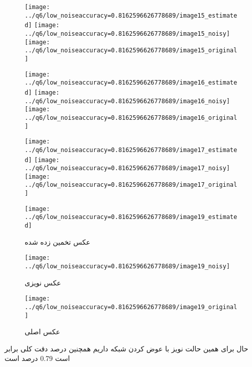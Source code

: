\documentclass[a4paper,12pt]{article}
\begin{document}
\begin{figure}[!htb]
  \texttt{[image: ../q6/low\_noiseaccuracy=0.8162596626778689/image15\_estimated]}
\endminipage\hfill
{}
  \texttt{[image: ../q6/low\_noiseaccuracy=0.8162596626778689/image15\_noisy]}
\endminipage\hfill
{}
  \texttt{[image: ../q6/low\_noiseaccuracy=0.8162596626778689/image15\_original]}
\endminipage\hfill

  \texttt{[image: ../q6/low\_noiseaccuracy=0.8162596626778689/image16\_estimated]}
\endminipage\hfill
{}
  \texttt{[image: ../q6/low\_noiseaccuracy=0.8162596626778689/image16\_noisy]}
\endminipage\hfill
{}
  \texttt{[image: ../q6/low\_noiseaccuracy=0.8162596626778689/image16\_original]}
\endminipage\hfill

  \texttt{[image: ../q6/low\_noiseaccuracy=0.8162596626778689/image17\_estimated]}
\endminipage\hfill
{}
  \texttt{[image: ../q6/low\_noiseaccuracy=0.8162596626778689/image17\_noisy]}
\endminipage\hfill
{}
  \texttt{[image: ../q6/low\_noiseaccuracy=0.8162596626778689/image17\_original]}
\endminipage\hfill

  \texttt{[image: ../q6/low\_noiseaccuracy=0.8162596626778689/image19\_estimated]}
  \caption{  عکس تخمین زده شده }
\endminipage\hfill
{}
  \texttt{[image: ../q6/low\_noiseaccuracy=0.8162596626778689/image19\_noisy]}
  \caption{  عکس نویزی }
\endminipage\hfill
{}
  \texttt{[image: ../q6/low\_noiseaccuracy=0.8162596626778689/image19\_original]}
  \caption{  عکس اصلی }
\endminipage\hfill
\end{figure}


حال برای همین حالت نویز با عوض کردن شبکه داریم همچنین درصد دقت کلی برابر است 0.79 درصد است
\end{document}
